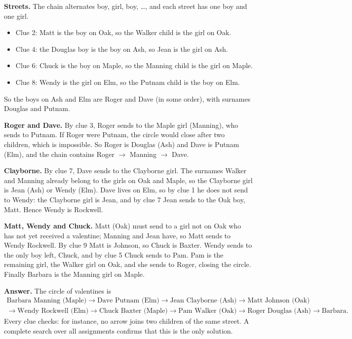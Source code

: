 \textbf{Streets.} The chain alternates boy, girl, boy, \dots, and each street has one boy and one girl.
\begin{itemize}
\item Clue 2: Matt is the boy on Oak, so the Walker child is the girl on Oak.
\item Clue 4: the Douglas boy is the boy on Ash, so Jean is the girl on Ash.
\item Clue 6: Chuck is the boy on Maple, so the Manning child is the girl on Maple.
\item Clue 8: Wendy is the girl on Elm, so the Putnam child is the boy on Elm.
\end{itemize}
So the boys on Ash and Elm are Roger and Dave (in some order), with surnames Douglas and Putnam.

\textbf{Roger and Dave.} By clue 3, Roger sends to the Maple girl (Manning), who sends to Putnam. If Roger were Putnam, the circle would close after two children, which is impossible. So Roger is Douglas (Ash) and Dave is Putnam (Elm), and the chain contains Roger $\to$ Manning $\to$ Dave.

\textbf{Clayborne.} By clue 7, Dave sends to the Clayborne girl. The surnames Walker and Manning already belong to the girls on Oak and Maple, so the Clayborne girl is Jean (Ash) or Wendy (Elm). Dave lives on Elm, so by clue 1 he does not send to Wendy: the Clayborne girl is Jean, and by clue 7 Jean sends to the Oak boy, Matt. Hence Wendy is Rockwell.

\textbf{Matt, Wendy and Chuck.} Matt (Oak) must send to a girl not on Oak who has not yet received a valentine; Manning and Jean have, so Matt sends to Wendy Rockwell. By clue 9 Matt is Johnson, so Chuck is Baxter. Wendy sends to the only boy left, Chuck, and by clue 5 Chuck sends to Pam. Pam is the remaining girl, the Walker girl on Oak, and she sends to Roger, closing the circle. Finally Barbara is the Manning girl on Maple.

\textbf{Answer.} The circle of valentines is
\[
\begin{array}{l}
\text{Barbara Manning (Maple)}\to\text{Dave Putnam (Elm)}\to\text{Jean Clayborne (Ash)}\to\text{Matt Johnson (Oak)}\\
\to\text{Wendy Rockwell (Elm)}\to\text{Chuck Baxter (Maple)}\to\text{Pam Walker (Oak)}\to\text{Roger Douglas (Ash)}\to\text{Barbara}.
\end{array}
\]
Every clue checks: for instance, no arrow joins two children of the same street. A complete search over all assignments confirms that this is the only solution.
